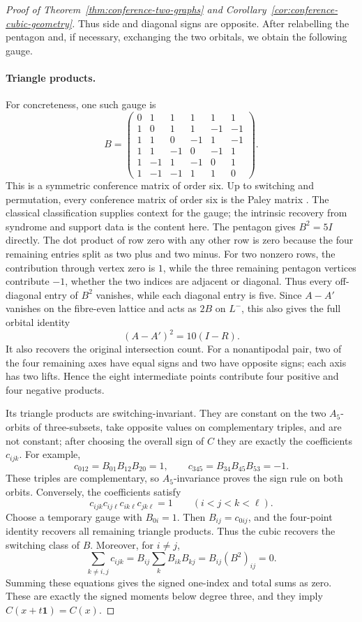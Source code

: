 \documentclass[11pt]{article}
\theoremstyle{definition}
\theoremstyle{remark}
\begin{document}
\begin{proof}[Proof of Theorem~\ref{thm:conference-two-graphs} and
Corollary~\ref{cor:conference-cubic-geometry}]
Thus side and diagonal signs are opposite. After relabelling the pentagon
and, if necessary, exchanging the two orbitals, we obtain the following
gauge.

\paragraph{Triangle products.}
For concreteness, one such gauge is
\[
B=\begin{pmatrix}
0&1&1&1&1&1\\
1&0&1&1&-1&-1\\
1&1&0&-1&1&-1\\
1&1&-1&0&-1&1\\
1&-1&1&-1&0&1\\
1&-1&-1&1&1&0
\end{pmatrix}.
\]
This is a symmetric conference matrix of order six. Up to switching and
permutation, every conference matrix of order six is the Paley matrix
\cite[\S2]{HaemersParsaeiMajd2022}. The classical classification supplies
context for the gauge; the intrinsic recovery from syndrome and support data
is the content here.
The pentagon gives $B^2=5I$ directly. The dot product of row zero with any
other row is zero because the four remaining entries split as two plus and
two minus. For two nonzero rows, the contribution through vertex zero is
$1$, while the three remaining pentagon vertices contribute $-1$, whether
the two indices are adjacent or diagonal. Thus every off-diagonal entry of
$B^2$ vanishes, while each diagonal entry is five.
Since $A-A'$ vanishes on the fibre-even lattice and acts as $2B$ on
$L^-$, this also gives the full orbital identity
\[
 (A-A')^2=10(I-R).
\]
It also recovers the original intersection count. For a nonantipodal pair,
two of the four remaining axes have equal signs and two have opposite signs;
each axis has two lifts. Hence the eight intermediate points contribute four
positive and four negative products.

Its triangle products are switching-invariant. They are constant on the
two $A_5$-orbits of three-subsets, take opposite values on complementary
triples, and are not constant; after choosing the overall sign of $C$ they
are exactly the coefficients $c_{ijk}$. For example,
\[
 c_{012}=B_{01}B_{12}B_{20}=1,
 \qquad c_{345}=B_{34}B_{45}B_{53}=-1.
\]
These triples are complementary, so $A_5$-invariance proves the sign rule
on both orbits. Conversely, the coefficients satisfy
\[
 c_{ijk}c_{ij\ell}c_{ik\ell}c_{jk\ell}=1
 \qquad(i<j<k<\ell).
\]
Choose a temporary gauge with $B_{0i}=1$.  Then
$B_{ij}=c_{0ij}$, and the four-point identity recovers all remaining
triangle products.  Thus the cubic recovers the switching class of $B$.
Moreover, for $i\ne j$,
\[
 \sum_{k\ne i,j}c_{ijk}
 =B_{ij}\sum_k B_{ik}B_{kj}
 =B_{ij}(B^2)_{ij}=0.
\]
Summing these equations gives the signed one-index and total sums as zero.
These are exactly the signed moments below degree three, and they imply
$C(x+t\mathbf1)=C(x)$.


\end{proof}
\end{document}
